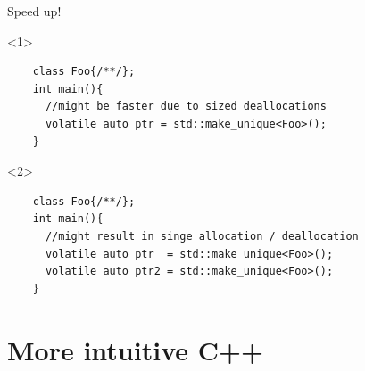 \documentclass[10pt]{beamer}
\begin{document}
\begin{frame}[fragile]{Speed up!}

\begin{onlyenv}<1>
	\begin{verbatim}
	class Foo{/**/};
	int main(){
	  //might be faster due to sized deallocations
	  volatile auto ptr = std::make_unique<Foo>(); 
	}
	\end{verbatim}
\end{onlyenv}

\begin{onlyenv}<2>
\begin{verbatim}
	class Foo{/**/};
	int main(){
	  //might result in singe allocation / deallocation
	  volatile auto ptr  = std::make_unique<Foo>();
	  volatile auto ptr2 = std::make_unique<Foo>(); 
	}
	\end{verbatim}
\end{onlyenv}

\end{frame}

\section{More intuitive C++}
\end{document}

